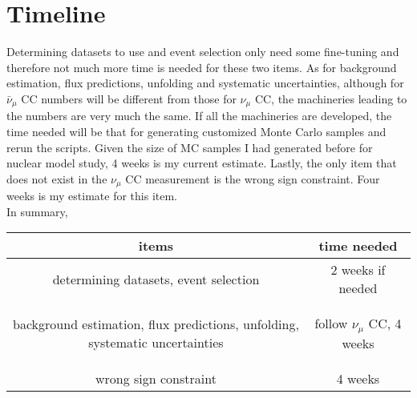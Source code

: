 \documentclass[12pt,a4paper,final]{iopart}
\begin{document}
\section{Timeline}
Determining datasets to use and event selection only need some fine-tuning and therefore not much more time is needed for these two items. As for background estimation, flux predictions, unfolding and systematic uncertainties, although for $\bar{\nu}_\mu$ CC numbers will be different from those for $\nu_\mu$ CC, the machineries leading to the numbers are very much the same. If all the machineries are developed, the time needed will be that for generating customized Monte Carlo samples and rerun the scripts. Given the size of MC samples I had generated before for nuclear model study, 4 weeks is my current estimate. Lastly, the only item that does not exist in the $\nu_\mu$ CC measurement is the wrong sign constraint. Four weeks is my estimate for this item.\\
In summary,
\begin{table}[h]
  \centering
  \begin{tabular}{|c|c|}
    \hline
    items & time needed \\
    \hline
    determining datasets, event selection & 2 weeks if needed \\
    \begin{scriptsize}background estimation, flux predictions, unfolding, systematic uncertainties\end{scriptsize} & follow $\nu_\mu$ CC, 4 weeks\\
    wrong sign constraint & 4 weeks\\
    \hline
  \end{tabular}
\end{table}

%
%
\end{document}
